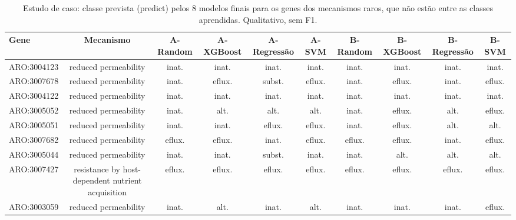 \begin{table}[htbp]
  \centering
  \caption{Estudo de caso: classe prevista (predict) pelos 8 modelos finais para os genes dos mecanismos raros, que não estão entre as classes aprendidas. Qualitativo, sem F1.}
  \label{tab:estudo_caso}
  \begin{tabular}{lccccccccc}
    \toprule
    Gene & Mecanismo & A-Random & A-XGBoost & A-Regressão & A-SVM & B-Random & B-XGBoost & B-Regressão & B-SVM \\
    \midrule
    ARO:3004123 & reduced permeability & inat. & inat. & inat. & inat. & inat. & inat. & inat. & inat. \\
    ARO:3007678 & reduced permeability & inat. & eflux. & subst. & eflux. & inat. & eflux. & inat. & eflux. \\
    ARO:3004122 & reduced permeability & inat. & inat. & inat. & inat. & inat. & inat. & inat. & inat. \\
    ARO:3005052 & reduced permeability & inat. & alt. & alt. & alt. & inat. & eflux. & alt. & eflux. \\
    ARO:3005051 & reduced permeability & inat. & inat. & eflux. & eflux. & inat. & eflux. & alt. & alt. \\
    ARO:3007682 & reduced permeability & eflux. & eflux. & inat. & eflux. & eflux. & eflux. & inat. & eflux. \\
    ARO:3005044 & reduced permeability & inat. & inat. & subst. & inat. & inat. & alt. & alt. & alt. \\
    ARO:3007427 & resistance by host-dependent nutrient acquisition & eflux. & eflux. & eflux. & eflux. & eflux. & eflux. & eflux. & eflux. \\
    ARO:3003059 & reduced permeability & inat. & alt. & inat. & alt. & inat. & inat. & inat. & eflux. \\
    \bottomrule
  \end{tabular}
\end{table}
